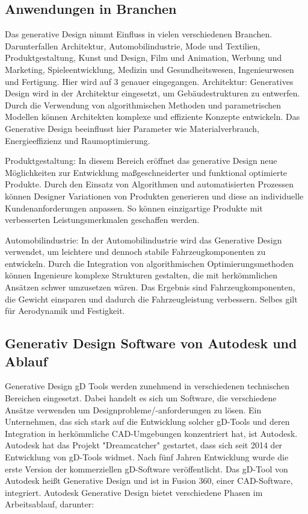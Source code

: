 \subsection*{Anwendungen in Branchen}
Das generative Design nimmt Einfluss in vielen verschiedenen Branchen. Darunterfallen Architektur, Automobilindustrie, Mode und Textilien, Produktgestaltung, Kunst und Design, Film und Animation, Werbung und Marketing, Spieleentwicklung, Medizin und Gesundheitswesen, Ingenieurwesen und Fertigung. Hier wird auf 3 genauer eingegangen.
Architektur: Generatives Design wird in der Architektur eingesetzt, um Gebäudestrukturen zu entwerfen. Durch die Verwendung von algorithmischen Methoden und parametrischen Modellen können Architekten komplexe und effiziente Konzepte entwickeln. Das Generative Design beeinflusst hier Parameter wie Materialverbrauch, Energieeffizienz und Raumoptimierung. 

Produktgestaltung: In diesem Bereich eröffnet das generative Design neue Möglichkeiten zur Entwicklung maßgeschneiderter und funktional optimierte Produkte. Durch den Einsatz von Algorithmen und automatisierten Prozessen können Designer Variationen von Produkten generieren und diese an individuelle Kundenanforderungen anpassen. So können einzigartige Produkte mit verbesserten Leistungsmerkmalen geschaffen werden. 

Automobilindustrie: In der Automobilindustrie wird das Generative Design verwendet, um leichtere und dennoch stabile Fahrzeugkomponenten zu entwickeln. Durch die Integration von algorithmischen Optimierungsmethoden können Ingenieure komplexe Strukturen gestalten, die mit herkömmlichen Ansätzen schwer umzusetzen wären. Das Ergebnis sind Fahrzeugkomponenten, die Gewicht einsparen und dadurch die Fahrzeugleistung verbessern. Selbes gilt für Aerodynamik und Festigkeit. \autocite*{8} \autocite{9}
\subsection*{Generativ Design Software von Autodesk und Ablauf}

Generative Design \ac*{gD} Tools werden zunehmend in verschiedenen technischen Bereichen eingesetzt. Dabei handelt es sich um Software, die verschiedene Ansätze verwenden um Designprobleme/-anforderungen zu lösen. Ein Unternehmen, das sich stark auf die Entwicklung solcher \ac*{gD}-Tools und deren Integration in herkömmliche \ac*{CAD}-Umgebungen konzentriert hat, ist Autodesk. Autodesk hat das Projekt "Dreamcatcher" gestartet, dass sich seit 2014 der Entwicklung von \ac*{gD}-Tools widmet. Nach fünf Jahren Entwicklung wurde die erste Version der kommerziellen \ac*{gD}-Software veröffentlicht. Das \ac*{gD}-Tool von Autodesk heißt Generative Design und ist in Fusion 360, einer \ac*{CAD}-Software, integriert.
Autodesk Generative Design bietet verschiedene Phasen im Arbeitsablauf, darunter:


